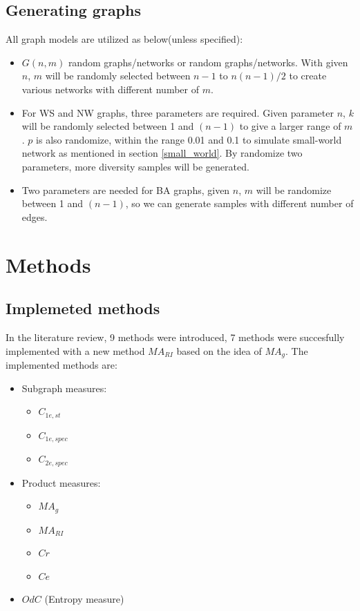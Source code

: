 \documentclass[12pt]{article}
\begin{document}
{\subsection{Generating graphs}
\label{generate_graphs}
All graph models are utilized as below(unless specified):
\begin{itemize}
    \item $G(n,m)$ random graphs/networks or random graphs/networks. With given $n$, $m$ will be randomly selected between $n-1$ to $n(n-1)/2$ to create various networks with different number of $m$.
    \item For WS and NW graphs, three parameters are required. Given parameter $n$, $k$ will be randomly selected between 1 and $(n-1)$ to give a larger range of $m$. $p$ is also randomize, within the range 0.01 and 0.1 to simulate small-world network as mentioned in section \ref{small_world}. By randomize two parameters, more diversity samples will be generated.
    \item Two parameters are needed for BA graphs, given $n$, $m$ will be randomize between 1 and $(n-1)$, so we can generate samples with different number of edges.
\end{itemize}

\section{Methods}
\subsection{Implemeted methods}
In the literature review\cite{litreview}, 9 methods were introduced, 7 methods were succesfully implemented with a new method $MA_{RI}$ based on the idea of $MA_g$. The implemented methods are:
\begin{itemize}
    \item Subgraph measures:
    \begin{itemize}
        \item $C_{1e,st}$
        \item $C_{1e,spec}$
        \item $C_{2e,spec}$
    \end{itemize}
    \item Product measures:
    \begin{itemize}
        \item $MA_g$
        \item $MA_{RI}$
        \item $Cr$
        \item $Ce$
    \end{itemize}
    \item $OdC$ (Entropy measure)
\end{itemize}

}
\end{document}
